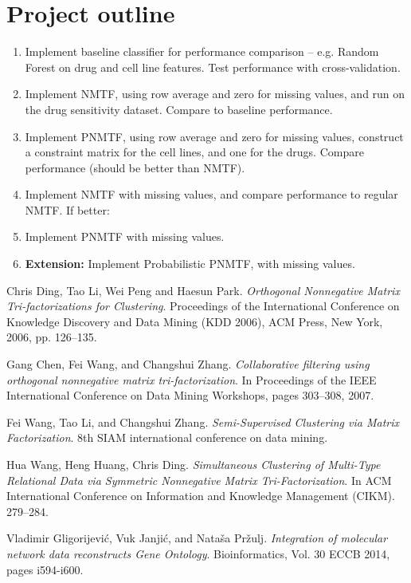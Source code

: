 \documentclass{article}
\begin{document}
	\section{Project outline}
		\begin{enumerate}
			\item Implement baseline classifier for performance comparison -- e.g. Random Forest on drug and cell line features. Test performance with cross-validation. 
			\item Implement NMTF, using row average and zero for missing values, and run on the drug sensitivity dataset. Compare to baseline performance.
			\item Implement PNMTF, using row average and zero for missing values, construct a constraint matrix for the cell lines, and one for the drugs. Compare performance (should be better than NMTF).
			\item Implement NMTF with missing values, and compare performance to regular NMTF. If better:
			\item Implement PNMTF with missing values.
			\item \textbf{Extension:}  Implement Probabilistic PNMTF, with missing values. 
		\end{enumerate}
	

\begin{thebibliography}{9}

  Chris Ding, Tao Li, Wei Peng and Haesun Park.
  \emph{Orthogonal Nonnegative Matrix Tri-factorizations for Clustering}.
  Proceedings of the International Conference on Knowledge Discovery and Data Mining (KDD 2006), ACM Press, New York, 2006, pp. 126–135.
  
  Gang Chen, Fei Wang, and Changshui Zhang.
  \emph{Collaborative filtering using orthogonal nonnegative matrix tri-factorization}.
  In Proceedings of the IEEE International Conference on Data Mining Workshops, pages 303–308, 2007.
  
  Fei Wang, Tao Li, and Changshui Zhang.
  \emph{Semi-Supervised Clustering via Matrix Factorization}.
  8th SIAM international conference on data mining.
  
  Hua Wang, Heng Huang, Chris Ding.
  \emph{Simultaneous Clustering of Multi-Type Relational Data via Symmetric Nonnegative Matrix Tri-Factorization}.
  In ACM International Conference on Information and Knowledge Management (CIKM). 279–284.
  
  Vladimir Gligorijevi\'{c}, Vuk Janji\'{c}, and Nata\v{s}a Pr\v{z}ulj.
  \emph{Integration of molecular network data reconstructs Gene Ontology}.
  Bioinformatics, 
  Vol. 30 ECCB 2014, pages i594-i600.
  
  

\end{thebibliography}
\end{document}
